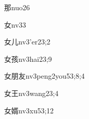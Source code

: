 \begin{verbete}{那}{nuo2}{6}
\end{verbete}
\begin{verbete}{女}{nv3}{3}
\end{verbete}
\begin{verbete}{女儿}{nv3'er2}{3;2}
\end{verbete}
\begin{verbete}{女孩}{nv3hai2}{3;9}
\end{verbete}
\begin{verbete}{女朋友}{nv3peng2you5}{3;8;4}
\end{verbete}
\begin{verbete}{女王}{nv3wang2}{3;4}
\end{verbete}
\begin{verbete}{女婿}{nv3xu5}{3;12}
\end{verbete}

